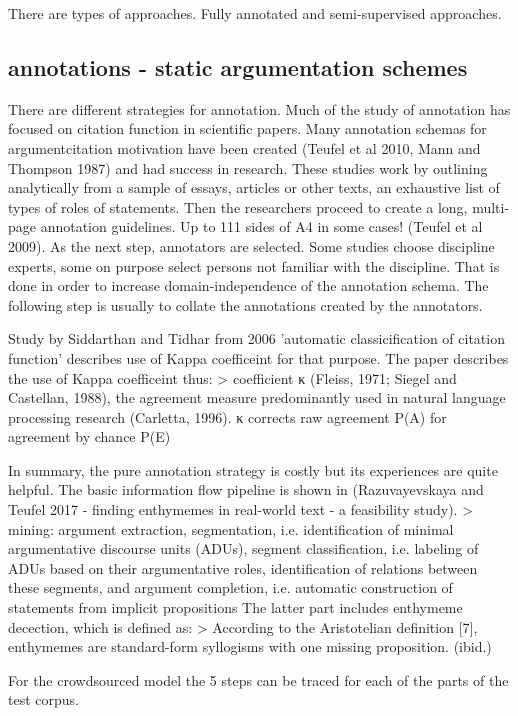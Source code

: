 \documentclass{article}
\begin{document}
There are types of approaches. Fully annotated and  semi-supervised approaches.

\subsection{annotations - static argumentation schemes}
There are different strategies for annotation. Much of the study of annotation has focused on citation function in scientific papers.
Many annotation schemas for argumentcitation motivation have been created (Teufel et al 2010, Mann and Thompson 1987) and had success in research.
These studies work by outlining analytically from a sample of essays, articles or other texts, an exhaustive list of types of roles of statements.
Then the researchers proceed to create a long, multi-page annotation guidelines. Up to 111 sides of A4 in some cases! (Teufel et al 2009).
As the next step, annotators are selected. Some studies choose discipline experts, some on purpose select persons not familiar with the discipline.
That is done in order to increase domain-independence of the annotation schema.
The following step is usually to collate the annotations created by the annotators. 

Study by Siddarthan and Tidhar from 2006 'automatic classicification of citation function' describes use of Kappa coefficeint for that purpose.
The paper describes the use of Kappa coefficeint thus:
> coefficient κ (Fleiss, 1971; Siegel and Castellan, 1988), the agreement measure predominantly used in natural language processing research (Carletta, 1996). κ corrects raw agreement P(A) for agreement by chance P(E)

In summary, the pure annotation strategy is costly but its experiences are quite helpful. The basic information flow pipeline is shown in (Razuvayevskaya and Teufel 2017 - finding enthymemes in real-world text - a feasibility study).
> mining: argument extraction, segmentation, i.e. identification of minimal argumentative discourse units (ADUs), segment classification, i.e. labeling of ADUs based on their argumentative roles, identification of relations between these segments, and argument completion, i.e. automatic construction of statements from implicit propositions
The latter part includes enthymeme decection, which is defined as:
> According to the Aristotelian definition [7], enthymemes are standard-form syllogisms with one missing proposition.  (ibid.)

For the crowdsourced model the 5 steps can be traced for each of the parts of the test corpus. 
\end{document}

